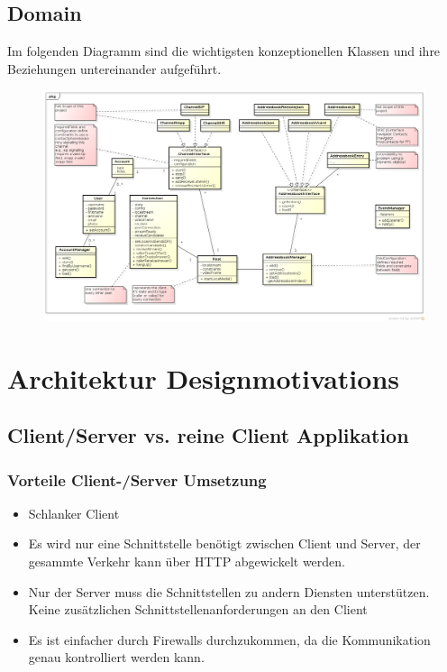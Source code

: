 	\begin{landscape}
		\section{Domain}
			Im folgenden Diagramm sind die wichtigsten konzeptionellen Klassen und ihre Beziehungen untereinander aufgeführt.
			\begin{figure}[h]
				\centering
				\includegraphics[width=1.2\textwidth]{../architekturanalayse/img/domain.png}
			\end{figure}
	\end{landscape}
	\clearpage

\section{Architektur Designmotivations}
	\subsection{Client/Server vs. reine Client Applikation}
		\subsubsection{Vorteile Client-/Server Umsetzung}
		\begin{itemize}
			\item Schlanker Client
			\item Es wird nur eine Schnittstelle benötigt zwischen Client und Server, der gesammte Verkehr kann über HTTP abgewickelt werden.
			\item Nur der Server muss die Schnittstellen zu andern Diensten unterstützen. Keine zusätzlichen Schnittstellenanforderungen an den Client
			\item Es ist einfacher durch Firewalls durchzukommen, da die Kommunikation genau kontrolliert werden kann.
		\end{itemize}
